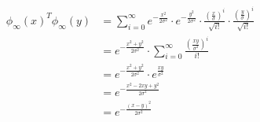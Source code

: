 \begin{align*}
\phi_\infty(x)^T \phi_\infty(y)
  &= \sum\limits_{i=0}^\infty e^{-\frac{x^2}{2 \sigma^2}} \cdot e^{-\frac{y^2}{2 \sigma^2}} \cdot \frac{(\frac{x}{\sigma})^i}{\sqrt{i!}} \cdot \frac{( \frac{y}{\sigma} )^i}{\sqrt{i!}} \\
  &= e^{-\frac{x^2+y^2}{2\sigma^2}} \cdot \sum\limits_{i=0}^\infty \frac{ (\frac{xy}{\sigma^2})^i }{i!} \\
  &= e^{-\frac{x^2+y^2}{2\sigma^2}} \cdot e^{\frac{xy}{\sigma^2}} \\
  &= e^{-\frac{x^2 - 2xy + y^2}{2\sigma^2}} \\
  &= e^{-\frac{(x-y)^2}{2\sigma^2}}
\end{align*}

